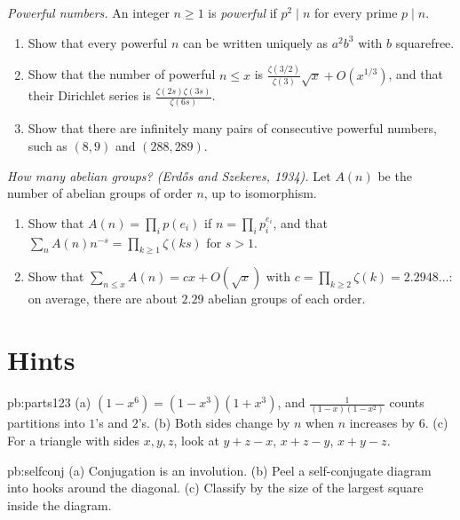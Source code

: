 \begin{exercise}[$\star\star$]\label{pb:powerful}
\emph{Powerful numbers.} An integer $n\ge1$ is \emph{powerful} if $p^2\mid n$ for every prime $p\mid n$.
\begin{enumerate}[label=(\alph*)]
\item Show that every powerful $n$ can be written uniquely as $a^2b^3$ with $b$ squarefree.
\item Show that the number of powerful $n\le x$ is $\frac{\zeta(3/2)}{\zeta(3)}\sqrt x+O(x^{1/3})$, and that their Dirichlet series is
$\frac{\zeta(2s)\zeta(3s)}{\zeta(6s)}$.
\item Show that there are infinitely many pairs of consecutive powerful numbers, such as $(8,9)$ and $(288,289)$.
\end{enumerate}
\end{exercise}

\begin{exercise}[$\star\star$]\label{pb:abelian}
\emph{How many abelian groups? (Erdős and Szekeres, 1934).} Let $A(n)$ be the number of abelian groups of order $n$, up to
isomorphism.
\begin{enumerate}[label=(\alph*)]
\item Show that $A(n)=\prod_ip(e_i)$ if $n=\prod_ip_i^{e_i}$, and that $\sum_nA(n)n^{-s}=\prod_{k\ge1}\zeta(ks)$ for $s>1$.
\item Show that $\sum_{n\le x}A(n)=cx+O(\sqrt x)$ with $c=\prod_{k\ge2}\zeta(k)=2.2948\ldots$: on average, there are about $2.29$
abelian groups of each order.
\end{enumerate}
\end{exercise}

\section{Hints}

\begin{hint}{pb:parts123}
(a) $(1-x^6)=(1-x^3)(1+x^3)$, and $\frac1{(1-x)(1-x^2)}$ counts partitions into $1$'s and $2$'s. (b) Both sides change by $n$
when $n$ increases by $6$. (c) For a triangle with sides $x,y,z$, look at $y+z-x$, $x+z-y$, $x+y-z$.
\end{hint}

\begin{hint}{pb:selfconj}
(a) Conjugation is an involution. (b) Peel a self-conjugate diagram into hooks around the diagonal. (c) Classify by the size of
the largest square inside the diagram.
\end{hint}


